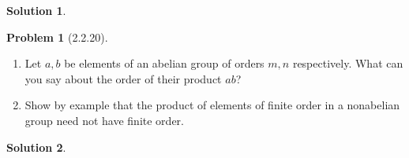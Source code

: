 \documentclass[12pt]{article}
\theoremstyle{definition} %
\newtheorem{solution}{Solution}
\newtheorem{problem}{Problem}
\theoremstyle{plain} %
\begin{document}
\begin{solution}
    
\end{solution}
\begin{problem}[2.2.20]
   \noindent
   \begin{enumerate}
    \item Let $a,b$ be elements of an abelian group of orders $m,n$ respectively. What can you say about the order of their product $ab$?
    \item Show by example that the product of elements of finite order in a nonabelian group need not have finite order.
   \end{enumerate} 
\end{problem}
\begin{solution}
    
\end{solution}
\end{document}
